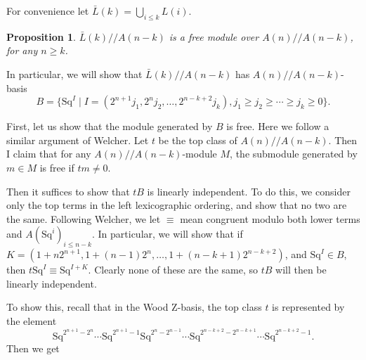 \documentclass{article}
\newcommand{\Sq}{\mathrm{Sq}}
\newtheorem{prop}{Proposition}
\begin{document}
  For convenience let $\bar{L}(k)=\bigcup_{i\leq k}L(i)$.

  \begin{prop}
    $\bar{L}(k)//A(n-k)$ is a free module over $A(n)//A(n-k)$, for any $n\geq k$.
  \end{prop}
  
  In particular, we will show that $\bar{L}(k)//A(n-k)$ has $A(n)//A(n-k)$-basis
  \[
    B=\{\Sq^I\mid I=(2^{n+1}j_1, 2^nj_2,\ldots, 2^{n-k+2}j_k), j_1\geq j_2\geq\cdots\geq j_k\geq 0\}.
  \]

  First, let us show that the module generated by $B$ is free.  Here we follow a similar argument of Welcher.  Let $t$ be the top class of $A(n)//A(n-k)$.  Then I claim that for any $A(n)//A(n-k)$-module $M$, the submodule generated by $m\in M$ is free if $tm\neq 0$.  %


  Then it suffices to show that $tB$ is linearly independent.  To do this, we consider only the top terms in the left lexicographic ordering, and show that no two are the same.  Following Welcher, we let $\equiv$ mean congruent modulo both lower terms and $A(\Sq^i)_{i\leq n-k}$.  In particular, we will show that if $K=(1+n 2^{n+1},1+(n-1)2^n,\ldots,1+(n-k+1)2^{n-k+2})$, and $\Sq^I\in B$, then $t\Sq^I\equiv\Sq^{I+K}$.  Clearly none of these are the same, so $tB$ will then be linearly independent.  

  To show this, recall that in the Wood Z-basis, the top class $t$ is represented by the element
  \[\Sq^{2^{n+1}-2^n}\cdots\Sq^{2^{n+1}-1}\Sq^{2^n-2^{n-1}}\cdots\Sq^{2^{n-k+2}-2^{n-k+1}}\cdots\Sq^{2^{n-k+2}-1}.\]
  Then we get 
\end{document}
